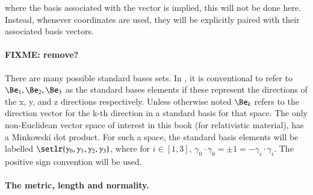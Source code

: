 where the basis associated with the vector is implied, this will not be done here.  Instead, whenever coordinates are used, they will be explicitly paired with their associated basis vectors.


\paragraph{FIXME: remove?}
There are many possible standard bases sets.  In , it is conventional to refer to \( \Be_1, \Be_2, \Be_3 \) as the standard bases elements if these represent the directions of the x, y, and z directions respectively.  Unless otherwise noted \( \Be_k \) refers to the direction vector for the k-th direction in a standard basis for that space.
The only non-Euclidean vector space of interest in this book (for relativistic material), has a Minkowski dot product.  For such a space, the standard basis elements will be labelled \( \setlr{ \gamma_0, \gamma_1, \gamma_2, \gamma_3 } \), where for \( i \in [1,3] \), \( \gamma_0 \cdot \gamma_0 = \pm 1 = -\gamma_i \cdot \gamma_i \).  The positive sign convention will be used.

%

\paragraph{The metric, length and normality.}

